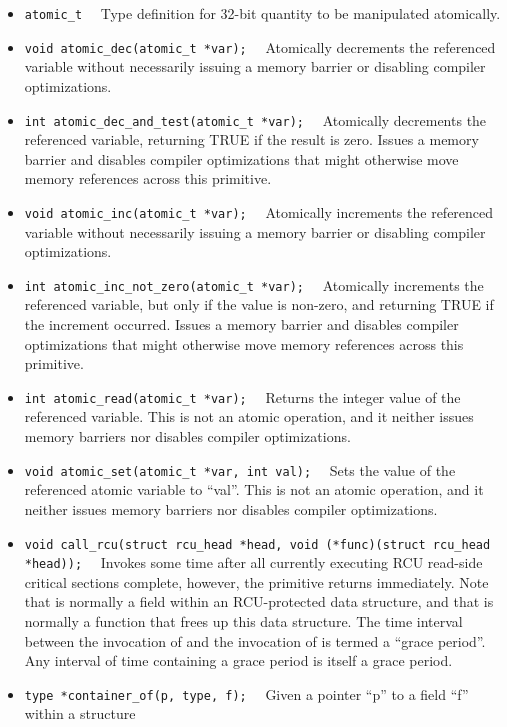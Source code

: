 \begin{itemize}
\item	{\tt atomic\_t}~~
	Type definition for 32-bit quantity to be manipulated atomically.
\item	{\tt void atomic\_dec(atomic\_t *var);}~~
	Atomically decrements the referenced variable without necessarily
	issuing a memory barrier or disabling compiler optimizations.
\item	{\tt int atomic\_dec\_and\_test(atomic\_t *var);}~~
	Atomically decrements the referenced variable, returning
	TRUE if the result is zero.
	Issues a memory barrier and disables compiler optimizations that
	might otherwise move memory references across this primitive.
\item	{\tt void atomic\_inc(atomic\_t *var);}~~
	Atomically increments the referenced variable without necessarily
	issuing a memory barrier or disabling compiler optimizations.
\item	{\tt int atomic\_inc\_not\_zero(atomic\_t *var);}~~
	Atomically increments the referenced variable, but only if the
	value is non-zero, and returning TRUE if the increment occurred.
	Issues a memory barrier and disables compiler optimizations that
	might otherwise move memory references across this primitive.
\item	{\tt int atomic\_read(atomic\_t *var);}~~
	Returns the integer value of the referenced variable.
	This is not an atomic operation, and it neither issues memory
	barriers nor disables compiler optimizations.
\item	{\tt void atomic\_set(atomic\_t *var, int val);}~~
	Sets the value of the referenced atomic variable to ``val''.
	This is not an atomic operation, and it neither issues memory
	barriers nor disables compiler optimizations.
\item	{\tt void call\_rcu(struct rcu\_head *head, void (*func)(struct rcu\_head *head));}~~
	Invokes  some time after all currently executing RCU
	read-side critical sections complete, however, the 
	primitive returns immediately.
	Note that  is normally a field within an RCU-protected
	data structure, and that  is normally a function that
	frees up this data structure.
	The time interval between the invocation of  and
	the invocation of  is termed a ``grace period''.
	Any interval of time containing a grace period is itself a
	grace period.
\item	{\tt type *container\_of(p, type, f);}~~
	Given a pointer ``p'' to a field ``f'' within a structure

\end{itemize}
